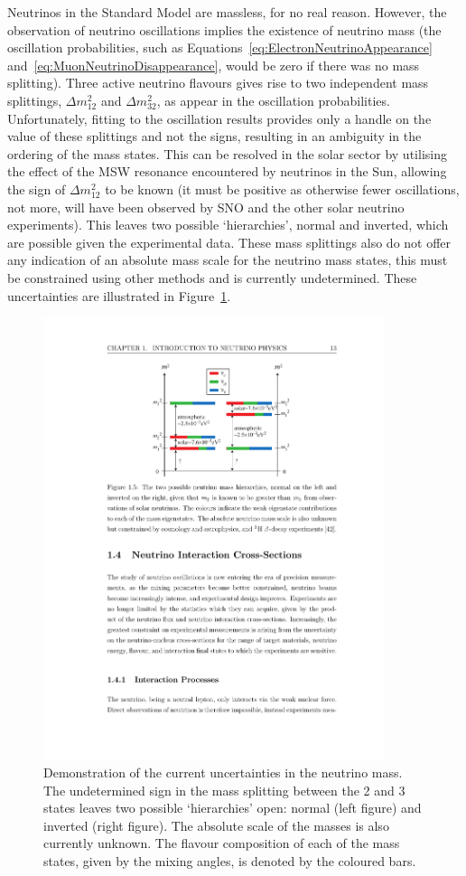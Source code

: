 Neutrinos in the Standard Model are massless, for no real reason.  However, the observation of neutrino oscillations implies the existence of neutrino mass (the oscillation probabilities, such as Equations~\ref{eq:ElectronNeutrinoAppearance} and~\ref{eq:MuonNeutrinoDisappearance}, would be zero if there was no mass splitting).  Three active neutrino flavours gives rise to two independent mass splittings, $\Delta m_{12}^2$ and $\Delta m_{32}^2$, as appear in the oscillation probabilities.  Unfortunately, fitting to the oscillation results provides only a handle on the value of these splittings and not the signs, resulting in an ambiguity in the ordering of the mass states.  This can be resolved in the solar sector by utilising the effect of the MSW resonance encountered by neutrinos in the Sun, allowing the sign of $\Delta m_{12}^2$ to be known (it must be positive as otherwise fewer oscillations, not more, will have been observed by SNO and the other solar neutrino experiments).  This leaves two possible `hierarchies', normal and inverted, which are possible given the experimental data.  These mass splittings also do not offer any indication of an absolute mass scale for the neutrino mass states, this must be constrained using other methods and is currently undetermined.  These uncertainties are illustrated in Figure~\ref{fig:MassHierarchy}.

\begin{figure}
  \centering
  \includegraphics[width=10cm]{MassHierarchy.pdf}
  \caption[Demonstration of the current uncertainties in the neutrino mass.]{Demonstration of the current uncertainties in the neutrino mass.  The undetermined sign in the mass splitting between the 2 and 3 states leaves two possible `hierarchies' open: normal (left figure) and inverted (right figure).  The absolute scale of the masses is also currently unknown.  The flavour composition of each of the mass states, given by the mixing angles, is denoted by the coloured bars.}
  \label{fig:MassHierarchy}
\end{figure}

